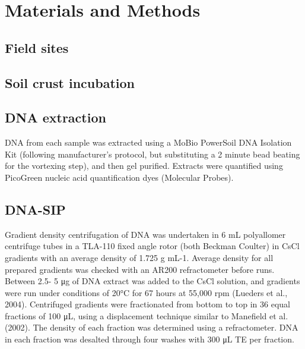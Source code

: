\section{Materials and Methods}
\subsection{Field sites}
\subsection{Soil crust incubation}
\subsection{DNA extraction}
DNA from each sample was extracted using a MoBio PowerSoil DNA Isolation Kit (following manufacturer’s protocol, but substituting a 2 minute bead beating for the vortexing step), and then gel purified. Extracts were quantified using PicoGreen nucleic acid quantification dyes (Molecular Probes). 
\subsection{DNA-SIP}
 Gradient density centrifugation of DNA was undertaken in 6 mL polyallomer centrifuge tubes in a TLA-110 fixed angle rotor (both Beckman Coulter) in CsCl gradients with an average density of 1.725 g mL-1.  Average density for all prepared gradients was checked with an AR200 refractometer before runs. Between 2.5- 5 μg of DNA extract was added to the CsCl solution, and gradients were run under conditions of 20°C for 67 hours at 55,000 rpm (Lueders et al., 2004). Centrifuged gradients were fractionated from bottom to top in 36 equal fractions of 100 μL, using a displacement technique similar to Manefield et al. (2002). The density of each fraction was determined using a refractometer. DNA in each fraction was desalted through four washes with 300 μL TE per fraction. 
